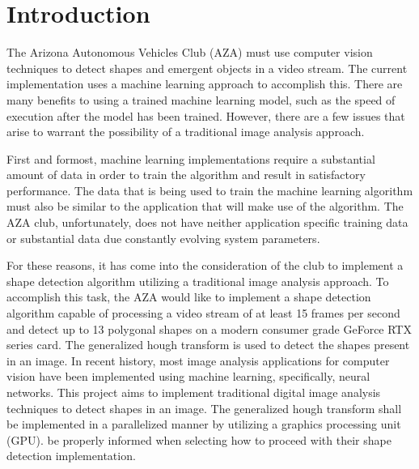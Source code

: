 \documentclass[conference]{IEEEtran}
\begin{document}



\section*{Introduction}

The Arizona Autonomous Vehicles Club (AZA) must use computer vision techniques to detect shapes and emergent objects in a video stream.
The current implementation uses a machine learning approach to accomplish this.
There are many benefits to using a trained machine learning model, such as the speed of execution after the model has been trained.
However, there are a few issues that arise to warrant the possibility of a traditional image analysis approach.

First and formost, machine learning implementations require a substantial amount of data in order to train the algorithm and result in satisfactory performance. 
The data that is being used to train the machine learning algorithm must also be similar to the application that will make use of the algorithm. 
The AZA club, unfortunately, does not have neither application specific training data or substantial data due constantly evolving system parameters. 

For these reasons, it has come into the consideration of the club to implement a shape detection algorithm utilizing a traditional image analysis approach.
To accomplish this task, the AZA would like to implement a shape detection algorithm capable of processing a video stream of at least 15 frames per second and detect up to 13 polygonal shapes on a modern consumer grade GeForce RTX series card.
The generalized hough transform\cite{BALLARD1981111} is used to detect the shapes present in an image.
In recent history, most image analysis applications for computer vision have been implemented using machine learning, specifically, neural networks. 
This project aims to implement traditional digital image analysis techniques to detect shapes in an image.
The generalized hough transform shall be implemented in a parallelized manner by utilizing a graphics processing unit (GPU).
be properly informed when selecting how to proceed with their shape detection implementation. 
\end{document}
